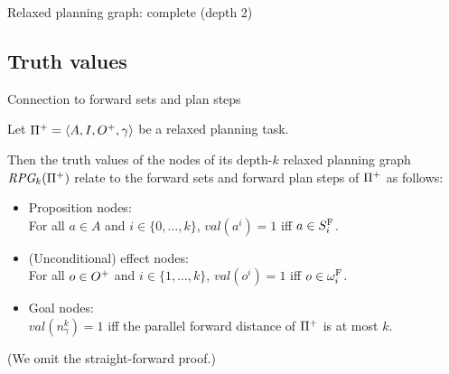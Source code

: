 \documentclass{gkibeamer}
\begin{document}
\begin{frame}{Relaxed planning graph: complete (depth 2)}
\begin{center}
 \end{center}
\end{frame}

\subsection{Truth values}

\begin{frame}{Connection to forward sets and plan steps}
  \begin{theorem}
    Let ${\Pi}^+ = \langle A, I, {O}^+, \gamma\rangle$ be
    a relaxed planning task.

    Then the truth values of the nodes of its depth-$k$ relaxed
    planning graph $\textit{RPG}_k({\Pi}^+)$ relate to
    the forward sets and forward plan steps of ${\Pi}^+$ as
    follows:
    \begin{itemize}
    \item \alert{Proposition nodes:} \\
      For all $a \in A$ and $i \in \{0, \dots, k\}$,
      $\textit{val}(a^i) = 1$ iff $a \in S^{\text F}_i$.
    \item \alert{(Unconditional) effect nodes:} \\
      For all $o \in {O}^+$ and $i \in \{1, \dots, k\}$, 
      $\textit{val}(o^i) = 1$ iff $o \in \omega^{\text F}_i$.
    \item \alert{Goal nodes:} \\
      $\textit{val}(n^k_\gamma) = 1$ iff the parallel forward distance of
      ${\Pi}^+$ is at most $k$.
    \end{itemize}
  \end{theorem}
  (We omit the straight-forward proof.)
\end{frame}
\end{document}
